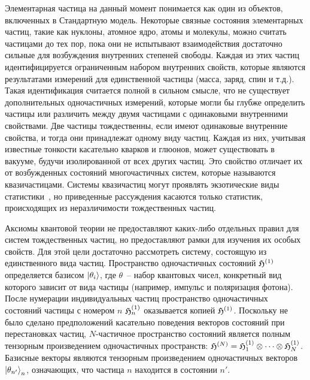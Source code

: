 \documentclass[a4paper, 12pt]{article}
\begin{document}


\label{sec:paper:2}

Элементарная частица на данный момент понимается как один из объектов, 
включенных в Стандартную модель. Некоторые связные состояния 
элементарных частиц, такие как нуклоны, атомное ядро, атомы и молекулы, 
можно считать частицами до тех пор, пока они не испытывают 
взаимодействия достаточно сильные для возбуждения внутренних степеней 
свободы. Каждая из этих частиц идентифицируется ограниченным набором 
внутренних свойств, которые являются результатами измерений для 
единственной частицы (масса, заряд, спин и т.д.). Такая идентификация 
считается полной в сильном смысле, что не существует дополнительных 
одночастичных измерений, которые могли бы глубже определить частицы или 
различить между двумя частицами с одинаковыми внутренними свойствами.
%
Две частицы тождественны, если имеют одинаковые внутренние свойства, 
и тогда они принадлежат одному виду частиц. Каждая из них, учитывая 
известные тонкости касательно кварков и глюонов, может существовать 
в вакууме, будучи изолированной от всех других частиц. Это свойство 
отличает их от возбужденных состояний многочастичных систем, которые 
называются квазичастицами. Системы квазичастиц могут проявлять 
экзотические виды статистики~\cite{ref12, ref13}, %
но приведенные рассуждения касаются только статистик, происходящих из 
неразличимости тождественных частиц.

Аксиомы квантовой теории не предоставляют каких-либо отдельных правил 
для систем тождественных частиц, но предоставляют рамки для изучения их 
особых свойств. Для этой цели достаточно рассмотреть систему, состоящую 
из единственного вида частиц. Пространство одночастичных состояний 
${\mathfrak{H}}^{(1)}$ определяется базисом ${\left|\theta_i\right\rangle}$, где $\theta$~-- 
набор квантовых чисел, конкретный вид которого зависит от вида частицы 
(например, импульс и поляризация фотона). После нумерации индивидуальных 
частиц пространство одночастичных состояний частицы с номером $n$ 
${\mathfrak{H}}^{(1)}_n$ оказывается копией ${\mathfrak{H}}^{(1)}$. Поскольку не было 
сделано предположений касательно поведения векторов состояний при 
перестановках частиц, $N$-частичное пространство состояний является 
полным тензорным произведением одночастичных пространств:
$\mathfrak{H}^{(N)} = {\mathfrak{H}}^{(1)}_1\otimes\cdots\otimes{\mathfrak{H}}^{(1)}_N$.
Базисные векторы являются тензорным произведением одночастичных векторов 
${\left|\theta_{n'}\right\rangle}_n$, означающих, что частица $n$ находится в состоянии 
$n'$.
\end{document}
